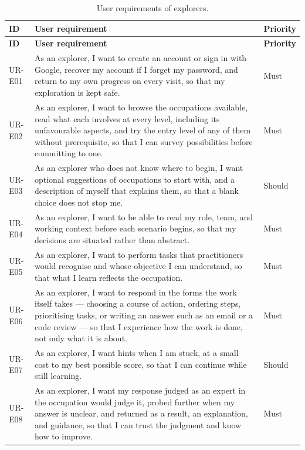 {\small
\begin{longtable}{|>{\raggedright\arraybackslash}p{}|>{\raggedright\arraybackslash}p{}|>{\raggedright\arraybackslash}p{}|}
\caption{User requirements of explorers.} \\
\hline
\textbf{ID} & \textbf{User requirement} & \textbf{Priority} \\ \hline
\endfirsthead
\hline
\textbf{ID} & \textbf{User requirement} & \textbf{Priority} \\ \hline
\endhead
UR-E01 & As an explorer, I want to create an account or sign in with Google, recover my account if I forget my password, and return to my own progress on every visit, so that my exploration is kept safe. & Must \\ \hline
UR-E02 & As an explorer, I want to browse the occupations available, read what each involves at every level, including its unfavourable aspects, and try the entry level of any of them without prerequisite, so that I can survey possibilities before committing to one. & Must \\ \hline
UR-E03 & As an explorer who does not know where to begin, I want optional suggestions of occupations to start with, and a description of myself that explains them, so that a blank choice does not stop me. & Should \\ \hline
UR-E04 & As an explorer, I want to be able to read my role, team, and working context before each scenario begins, so that my decisions are situated rather than abstract. & Must \\ \hline
UR-E05 & As an explorer, I want to perform tasks that practitioners would recognise and whose objective I can understand, so that what I learn reflects the occupation. & Must \\ \hline
UR-E06 & As an explorer, I want to respond in the forms the work itself takes --- choosing a course of action, ordering steps, prioritising tasks, or writing an answer such as an email or a code review --- so that I experience how the work is done, not only what it is about. & Must \\ \hline
UR-E07 & As an explorer, I want hints when I am stuck, at a small cost to my best possible score, so that I can continue while still learning. & Should \\ \hline
UR-E08 & As an explorer, I want my response judged as an expert in the occupation would judge it, probed further when my answer is unclear, and returned as a result, an explanation, and guidance, so that I can trust the judgment and know how to improve. & Must \\ \hline

\end{longtable}}
